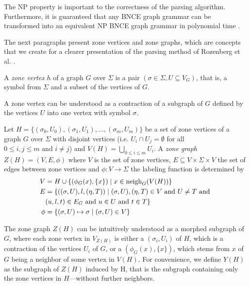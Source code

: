 The NP property is important to the correctness of the parsing algorithm. Furthermore, it is guaranteed that any BNCE graph grammar can be transformed into an equivalent NP BNCE graph grammar in polynomial time \cite{rozenberg1986boundary, skodinis1998neighborhood}.

The next paragraphs present zone vertices and zone graphs, which are concepts that we create for a clearer presentation of the parsing method of Rozenberg et al. \citep{rozenberg1986boundary}.

\begin{definition}
	\label{def:zv}
	A \emph{zone vertex} $h$ of a graph $G$ over $\Sigma$ is a pair $(\sigma \in \Sigma, U \subseteq V_G)$, that is, a symbol from $\Sigma$ and a subset of the vertices of $G$.
\end{definition}

A zone vertex can be understood as a contraction of a subgraph of $G$ defined by the vertices $U$ into one vertex with symbol $\sigma$.

\begin{definition}
	\label{def:z}
	Let $H = \{(\sigma_0,U_0),(\sigma_1,U_1),\dots,(\sigma_m,U_m)\}$ be a set of zone vertices of a graph $G$ over $\Sigma$ with disjoint vertices (i.e. $U_i \cap U_j = \emptyset$ for all $0 \leq i,j \leq m \text{ and } i \neq j$) and $V(H) = \bigcup_{0 \leq i \leq m}{U_i}$. A \emph{zone graph} $Z(H) = (V, E, \phi)$ where $V$ is the set of zone vertices, $E \subseteq V \times \Sigma \times V$ the set of edges between zone vertices and $\phi: V \to \Sigma$ the labeling function is determined by
	\begin{align*}
		V & = H \cup \{(\phi_G(x),\{x\}) \; | \; x \in \operatorname{neigh}_{G}(V(H)) \}\\
		E & = \{((\sigma,U),l,(\eta,T)) \; | \; (\sigma,U),(\eta,T) \in V \text{ and } U \neq T \text{ and } \\
		& (u,l,t) \in E_G \text{ and } u \in U \text{ and } t \in T\} \\
		\phi & = \{(\sigma,U) \mapsto \sigma  \; | \; (\sigma,U) \in V\}
	\end{align*}
\end{definition}

The zone graph $Z(H)$ can be intuitively understood as a morphed subgraph of $G$, where each zone vertex in $V_{Z(H)}$ is either a $(\sigma_i,U_i)$ of $H$, which is a contraction of the vertices $U_i$ of $G$, or a $(\phi_G(x),\{x\})$, which stems from $x$ of $G$ being a neighbor of some vertex in $V(H)$. For convenience, we define $Y(H)$ as the subgraph of $Z(H)$ induced by H, that is the subgraph containing only the zone vertices in $H$---without further neighbors.

